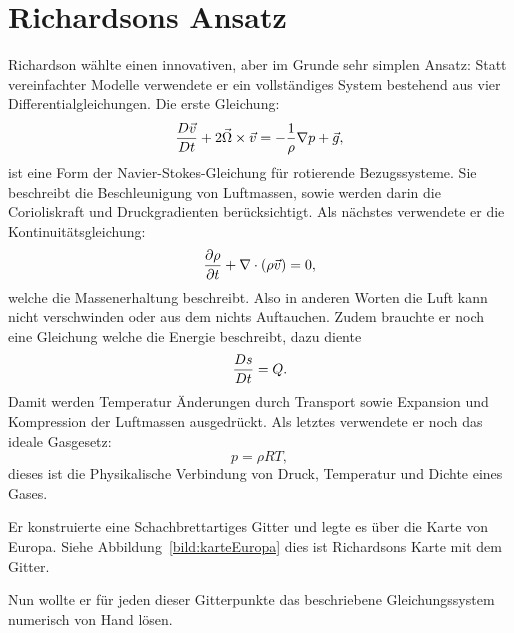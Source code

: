%
%
%
%
\section{Richardsons Ansatz \label{geostrophisch:section:richardsonAnsatz}}

Richardson wählte einen innovativen, aber im Grunde sehr simplen Ansatz:  
Statt vereinfachter Modelle verwendete er ein vollständiges System bestehend aus vier Differentialgleichungen.
Die erste Gleichung:
\begin{equation}
	\frac{D\vec{v}}{Dt} + 2\vec{\Omega} \times \vec{v} = -\frac{1}{\rho}\nabla p + \vec{g} \\,
	\label{eq:navstok}
\end{equation}
ist eine Form der Navier-Stokes-Gleichung für rotierende Bezugssysteme.
Sie beschreibt die Beschleunigung von Luftmassen, sowie werden darin die Corioliskraft und Druckgradienten berücksichtigt.
Als nächstes verwendete er die Kontinuitätsgleichung:
\begin{equation}
	\frac{\partial \rho}{\partial t} + \nabla \cdot (\rho \vec{v}) = 0 \\,
	\label{eq:kont}
\end{equation}
welche die Massenerhaltung beschreibt.
Also in anderen Worten die Luft kann nicht verschwinden oder aus dem nichts Auftauchen. 
Zudem brauchte er noch eine Gleichung welche die Energie beschreibt, dazu diente 
\begin{equation}
	\frac{Ds}{Dt} = Q \\.
	\label{eq:enrgy}
\end{equation}
Damit werden Temperatur Änderungen durch Transport sowie Expansion und Kompression der Luftmassen ausgedrückt.
Als letztes verwendete er noch das ideale Gasgesetz:
\begin{equation}
	p = \rho R T,
	\label{eq:gasgesetz}
\end{equation}
dieses ist die Physikalische Verbindung von Druck, Temperatur und Dichte eines Gases.  

Er konstruierte eine Schachbrettartiges Gitter und legte es über die Karte von Europa.
Siehe Abbildung~\ref{bild:karteEuropa} dies ist Richardsons Karte mit dem Gitter. 

Nun wollte er für jeden dieser Gitterpunkte das beschriebene Gleichungssystem numerisch von Hand lösen. 

